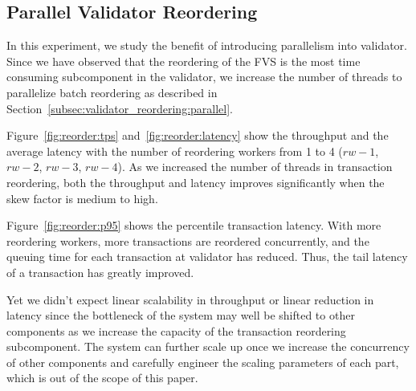 \subsection{Parallel Validator Reordering}
In this experiment, we study the benefit of introducing parallelism into validator. Since we have observed that the reordering of the FVS is the most time consuming subcomponent in the validator, we increase the number of threads to parallelize batch reordering as described in Section~\ref{subsec:validator_reordering:parallel}. 

Figure~\ref{fig:reorder:tps} and~\ref{fig:reorder:latency} show the throughput and the average latency with the number of reordering workers from 1 to 4 ($rw-1$, $rw-2$, $rw-3$, $rw-4$). As we increased the number of threads in transaction reordering, both the throughput and latency improves significantly when the skew factor is medium to high.

Figure~\ref{fig:reorder:p95} shows the percentile transaction latency. With more reordering workers, more transactions are reordered concurrently, and the queuing time for each transaction at validator has reduced. Thus, the tail latency of a transaction has greatly improved. 

Yet we didn't expect linear scalability in throughput or linear reduction in latency since the bottleneck of the system may well be shifted to other components as we increase the capacity of the transaction reordering subcomponent. The system can further scale up once we increase the concurrency of other components and carefully engineer the scaling parameters of each part, which is out of the scope of this paper.
